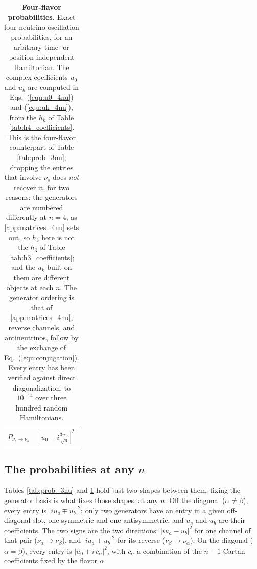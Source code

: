 \documentclass[final,5p,times,twocolumn,sort,compress]{elsarticle}
\newcommand{\eq}{Eq.}
\newcommand{\equ}[1]{\eq~(\ref{equ:#1})}
\begin{document}
{\begin{table}[t!]
\begin{tabular}{lc}
  $P_{\nu_s \to \nu_s}$        & $\left\vert u_0 - i \frac{3 u_{15}}{\sqrt{6}} \right\vert^2$ \\
 \end{tabular}
 \caption{\label{tab:prob_4nu}{\bf Four-flavor probabilities.} Exact four-neutrino oscillation probabilities, for an arbitrary time- or position-independent Hamiltonian.  The complex coefficients $u_0$ and $u_k$ are computed in Eqs.\ (\ref{equ:u0_4nu}) and (\ref{equ:uk_4nu}), from the $h_k$ of Table \ref{tab:h4_coefficients}.  This is the four-flavor counterpart of Table \ref{tab:prob_3nu}; dropping the entries that involve $\nu_s$ does \emph{not} recover it, for two reasons: the generators are numbered differently at $n = 4$, as \ref{app:matrices_4nu} sets out, so $h_3$ here is not the $h_3$ of Table \ref{tab:h3_coefficients}; and the $u_k$ built on them are different objects at each $n$.  The generator ordering is that of \ref{app:matrices_4nu}; reverse channels, and antineutrinos, follow by the exchange of \equ{conjugation}.  Every entry has been verified against direct diagonalization, to $10^{-14}$ over three hundred random Hamiltonians.}
\end{table}
}


\subsection{The probabilities at any $n$}

Tables \ref{tab:prob_3nu} and \ref{tab:prob_4nu} hold just two shapes between them; fixing the generator basis is what fixes those shapes, at any $n$.  Off the diagonal ($\alpha \neq \beta$), every entry is $\lvert i u_a \mp u_b \rvert^2$: only two generators have an entry in a given off-diagonal slot, one symmetric and one antisymmetric, and $u_a$ and $u_b$ are their coefficients.  The two signs are the two directions: $\lvert i u_a - u_b \rvert^2$ for one channel of that pair ($\nu_\alpha \to \nu_\beta$), and $\lvert i u_a + u_b \rvert^2$ for its reverse ($\nu_\beta \to \nu_\alpha$).  On the diagonal ($\alpha = \beta$), every entry is $\lvert u_0 + i \, c_\alpha \rvert^2$, with $c_\alpha$ a combination of the $n-1$ Cartan coefficients fixed by the flavor $\alpha$.
\end{document}
